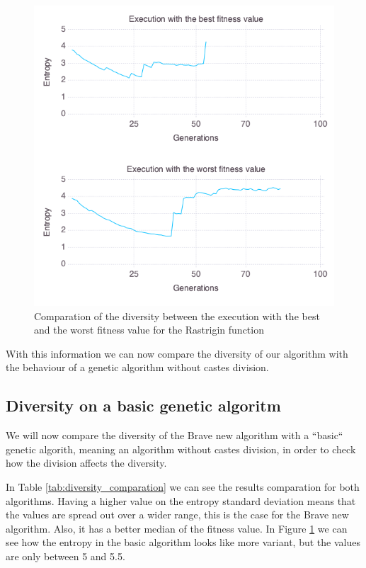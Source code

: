 \begin{figure}[]
	\centering	
	\includegraphics[scale=0.5]{./figures/config_file_10_Rastrigin_diversity_comparation.png}
	\caption{ Comparation of the diversity between the execution with the best and the worst fitness value for the Rastrigin function }
    \label{fig:rastrigin_diversity_comparation}
\end{figure}

With this information we can now compare the diversity of our algorithm with the behaviour of a genetic algorithm without
castes division.

\subsection{Diversity on a basic genetic algoritm}

We will now compare the diversity of the Brave new algorithm with a ``basic`` genetic algorith, meaning an algorithm without castes division, in order
to check how the division affects the diversity.

In Table \ref{tab:diversity_comparation} we can see the results comparation for both algorithms. Having a higher value on
the entropy standard deviation means that the values are spread out over a wider range, this is the case for the Brave
new algorithm. Also, it has a better median of the fitness value. In Figure \ref{fig:rastrigin_diversity_comparation} we can see
how the entropy in the basic algorithm looks like more variant, but the values are only between 5 and 5.5.

